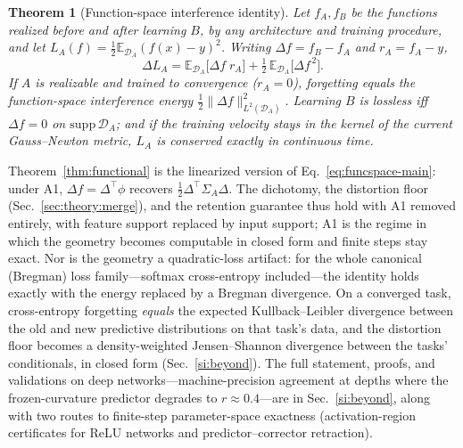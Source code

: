 \documentclass[10pt,a4paper]{article}
\theoremstyle{plain}
\newtheorem{theorem}{Theorem}
\theoremstyle{definition}
\newcommand{\Sig}{\Sigma}
\newcommand{\Del}{\Delta}
\begin{document}
\begin{theorem}[Function-space interference identity]
\label{thm:funcspace}
Let $f_A,f_B$ be the functions realized before and after learning $B$, by any
architecture and training procedure, and let $L_A(f)=\tfrac12\mathbb{E}_{\mathcal
D_A}(f(x)-y)^2$. Writing $\Del\!f=f_B-f_A$ and $r_A=f_A-y$,
\begin{equation}
\Del L_A=\mathbb{E}_{\mathcal D_A}\!\big[\Del\!f\;r_A\big]
+\tfrac12\,\mathbb{E}_{\mathcal D_A}\!\big[\Del\!f^{\,2}\big].
\label{eq:funcspace-main}
\end{equation}
If $A$ is realizable and trained to convergence ($r_A=0$), forgetting equals the
function-space interference energy $\tfrac12\|\Del\!f\|_{L^2(\mathcal D_A)}^2$. Learning
$B$ is lossless iff $\Del\!f=0$ on $\mathrm{supp}\,\mathcal D_A$; and if the training
velocity stays in the kernel of the current Gauss--Newton metric, $L_A$ is conserved
exactly in continuous time.
\end{theorem}
\noindent Theorem~\ref{thm:functional} is the linearized version of
Eq.~\eqref{eq:funcspace-main}: under A1, $\Del\!f=\Del^\top\phi$ recovers
$\tfrac12\Del^\top\Sig_A\Del$. The dichotomy, the distortion floor
(Sec.~\ref{sec:theory:merge}), and the retention guarantee thus hold with A1 removed
entirely, with feature support replaced by input support; A1 is the regime in which the
geometry becomes computable in closed form and finite steps stay exact. Nor is the
geometry a quadratic-loss artifact: for the whole canonical (Bregman) loss
family---softmax cross-entropy included---the identity holds exactly with the energy
replaced by a Bregman divergence. On a converged task, cross-entropy forgetting
\emph{equals} the expected Kullback--Leibler divergence between the old and new
predictive distributions on that task's data, and the distortion floor becomes a
density-weighted Jensen--Shannon divergence between the tasks' conditionals, in closed
form (Sec.~\ref{si:beyond}). The full
statement, proofs, and validations on deep networks---machine-precision agreement at
depths where the frozen-curvature predictor degrades to $r\approx0.4$---are in
Sec.~\ref{si:beyond}, along with two routes to finite-step parameter-space exactness
(activation-region certificates for ReLU networks and predictor--corrector retraction).
\end{document}
